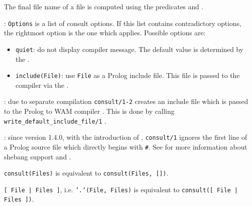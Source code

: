 The final file name of a file is computed using the predicates
  and
 .

: \texttt{Options} is a list of consult options. If this
list contains contradictory options, the rightmost option is the one which
applies. Possible options are:

\begin{itemize}

\item {}\texttt{quiet}: do not display compiler message. The
  default value is determined by the 
  .

\item {}\texttt{include(File)}: use \texttt{File} as
  a Prolog include file. This file is passed to the compiler via the
   .

\end{itemize}


: due to separate compilation
\texttt{consult/1-2} creates an include file which is passed to the
Prolog to WAM compiler . This is done by
calling \texttt{write\_default\_include\_file/1}
.

: since version 1.4.0, with the introduction of
, \texttt{consult/1} ignores the first line of a Prolog
source file which directly begins with \texttt{\#}. See
 for more information about shebang support and
.


\texttt{consult(Files)} is equivalent to \texttt{consult(Files, [])}.

\texttt{[ File | Files ]}, i.e. \texttt{'.'(File, Files)} is
equivalent to \texttt{consult([ File | Files ])}.


